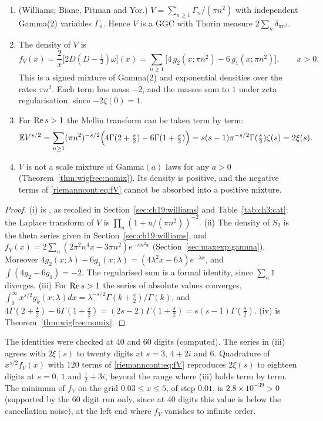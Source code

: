 \begin{proposition}\label{riemanncont:prop:riemann}
\begin{enumerate}
\item[(i)] (Williams; Biane, Pitman and Yor.) $V=\sum_{n\ge1}\Gamma_n/(\pi n^2)$ with independent Gamma(2) variables $\Gamma_n$. Hence $V$ is a GGC with Thorin measure $2\sum_n\delta_{\pi n^2}$.
\item[(ii)] The density of $V$ is
\begin{equation}\label{riemanncont:eq:fV}
f_V(x)=\frac2x\big[2D(D-\tfrac12)\omega\big](x)=\sum_{n\ge1}\Big[4\,g_2(x;\pi n^2)-6\,g_1(x;\pi n^2)\Big],\qquad x>0 .
\end{equation}
This is a signed mixture of Gamma(2) and exponential densities over the rates $\pi n^2$. Each term has mass $-2$, and the masses sum to $1$ under zeta regularisation, since $-2\zeta(0)=1$.
\item[(iii)] For $\operatorname{Re} s>1$ the Mellin transform can be taken term by term:
\[
\mathbb{E} V^{s/2}=\sum_{n\ge1}(\pi n^2)^{-s/2}\Big(4\Gamma(2+\tfrac s2)-6\Gamma(1+\tfrac s2)\Big)=s(s-1)\pi^{-s/2}\Gamma(\tfrac s2)\zeta(s)=2\xi(s).
\]
\item[(iv)] $V$ is not a scale mixture of Gamma$(a)$ laws for any $a>0$ (Theorem~\ref{thm:wigfree:nomix}). Its density is positive, and the negative terms of \eqref{riemanncont:eq:fV} cannot be absorbed into a positive mixture.
\end{enumerate}
\end{proposition}

\begin{proof}
(i) is \cite{Williams90,BPY01}, as recalled in Section~\ref{sec:ch19:williams} and Table~\ref{tab:ch3:cat}: the Laplace transform of $V$ is $\prod_n(1+u/(\pi n^2))^{-2}$. (ii) The density of $S_2$ is the theta series given in Section~\ref{sec:ch19:williams}, and $f_V(x)=2\sum_n(2\pi^2n^4x-3\pi n^2)e^{-\pi n^2x}$ (Section~\ref{sec:maxexp:gamma}). Moreover $4g_2(x;\lambda)-6g_1(x;\lambda)=(4\lambda^2x-6\lambda)e^{-\lambda x}$, and $\int(4g_2-6g_1)=-2$. The regularised sum is a formal identity, since $\sum_n1$ diverges. (iii) For $\operatorname{Re} s>1$ the series of absolute values converges, $\int_0^\infty x^{s/2}g_k(x;\lambda)dx=\lambda^{-s/2}\Gamma(k+\frac s2)/\Gamma(k)$, and $4\Gamma(2+\frac s2)-6\Gamma(1+\frac s2)=(2s-2)\Gamma(1+\frac s2)=s(s-1)\Gamma(\frac s2)$. (iv) is Theorem~\ref{thm:wigfree:nomix}.
\end{proof}

The identities were checked at $40$ and $60$ digits (computed). The series in (iii) agrees with $2\xi(s)$ to twenty digits at $s=3$, $4+2i$ and $6$. Quadrature of $x^{s/2}f_V(x)$ with $120$ terms of \eqref{riemanncont:eq:fV} reproduces $2\xi(s)$ to eighteen digits at $s=0$, $1$ and $\frac12+3i$, beyond the range where (iii) holds term by term. The minimum of $f_V$ on the grid $0.03\le x\le5$, of step $0.01$, is $2.8\times10^{-39}>0$ (supported by the $60$ digit run only, since at $40$ digits this value is below the cancellation noise), at the left end where $f_V$ vanishes to infinite order.

